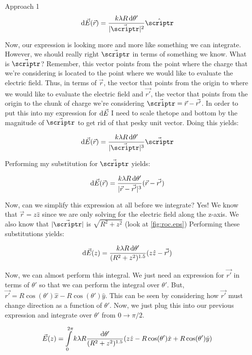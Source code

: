 \begin{homeworkProblem}
\begin{homeworkSection}{Approach 1}
        \[ \diff \vec{E}(\vec{r}) = \frac{k \lambda R \diff
        \theta'}{|\vec{\scriptr}|^2} \hat{\scriptr} \]

        Now, our expression is looking more and more like something we
        can integrate. However, we should really right $\vec{\scriptr}$
        in terms of something we know. What is $\vec{\scriptr}$?
        Remember, this vector points from the point where the charge
        that we're considering is located to the point where we would
        like to evaluate the electric field. Thus, in terms of
        $\vec{r}$, the vector that points from the origin to where we
        would like to evaluate the electric field and $\vec{r'}$, the
        vector that points from the origin to the chunk of charge we're
        considering $\vec{\scriptr} = \vec{r}-\vec{r'}$. In order to put
        this into my expression for $\mathop{}\!\mathrm{d} \vec{E}$ I need to scale
        thetope and bottom by the magnitude of $\vec{\scriptr}$ to get
        rid of that pesky unit vector. Doing this yields:
        
        \[ \diff \vec{E}(\vec{r}) = \frac{k \lambda R \diff
        \theta'}{|\vec{\scriptr}|^3} \vec{\scriptr} \]

        Performing my substitution for $\vec{\scriptr}$ yields:

        \[ \mathop{}\!\mathrm{d} \vec{E}(\vec{r}) = \frac{k \lambda R \mathop{}\!\mathrm{d}
        \theta'}{|\vec{r}-\vec{r'}|^3} (\vec{r} - \vec{r'}) \]

        Now, can we simplify this expression at all before we integrate?
        Yes! We know that $\vec{r} = z \hat{z}$ since we are only
        solving for the electric field along the z-axis. We also know
        that $|\vec{\scriptr}|$ is $\sqrt{R^2+z^2}$ (look at
        \ref{fig:roc.eps})
        Performing these substitutions yields:

        \[ \mathop{}\!\mathrm{d} \vec{E}(z) = \frac{k \lambda R \mathop{}\!\mathrm{d}
        \theta'}{(R^2+z^2)^{1.5}} (z \hat{z}- \vec{r'}) \]

        Now, we can almost perform this integral. We just need an
        expression for $\vec{r'}$ in terms of $\theta'$ so that we can
        perform the integral over $\theta'$. But, $\vec{r'} =
        R\cos(\theta')\hat{x} - R\cos(\theta')\hat{y}$. This can be seen
        by considering how $\vec{r'}$ must change direction as a
        function of $\theta'$. Now, we just plug this into our previous
        expression and integrate over $\theta'$ from $0 \rightarrow
        \pi/2$.

        \[ \vec{E}(z) = \int\limits_0^{2\pi} k \lambda R \frac{ \mathop{}\!\mathrm{d}
        \theta'}{(R^2+z^2)^{1.5}} (z \hat{z}-
        R\cos(\theta')\hat{x}+R\cos(\theta')\hat{y}) \]


\end{homeworkSection}
\end{homeworkProblem}
